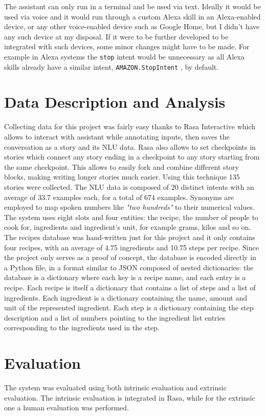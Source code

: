\documentclass[journal, 11pt]{IEEEtran}
\begin{document}
The assistant can only run in a terminal and be used via text. Ideally it would be used via voice and it would run through a custom Alexa skill in an Alexa-enabled device, or any other voice-enabled device such as Google Home, but I didn't have any such device at my disposal.
If it were to be further developed to be integrated with such devices, some minor changes might have to be made. For example in Alexa systems the \texttt{stop} intent would be unnecessary as all Alexa skills already have a similar intent, \texttt{AMAZON.StopIntent} \cite{rasatoalexa}, by default.


\section{Data Description and Analysis}
\label{sec:data-desc}
Collecting data for this project was fairly easy thanks to Rasa Interactive \cite{rasainteractive} which allows to interact with assistant while annotating inputs, then saves the conversation as a story and its NLU data.
Rasa also allows to set checkpoints in stories which connect any story ending in a checkpoint to any story starting from the same checkpoint. This allows to easily fork and combine different story blocks, making writing longer stories much easier. Using this technique 135 stories were collected.
The NLU data is composed of 20 distinct intents with an average of 33.7 examples each, for a total of 674 examples.
Synonyms are employed to map spoken numbers like \textit{"two hundreds"} to their numerical values.
The system uses eight slots and four entities: the recipe, the number of people to cook for, ingredients and ingredient's unit, for example grams, kilos and so on.
The recipes database was hand-written just for this project and it only contains four recipes, with an average of 4.75 ingredients and 10.75 steps per recipe.
Since the project only serves as a proof of concept, the database is encoded directly in a Python file, in a format similar to JSON composed of nested dictionaries: the database is a dictionary where each key is a recipe name, and each entry is a recipe.
Each recipe is itself a dictionary that contains a list of steps and a list of ingredients.
Each ingredient is a dictionary containing the name, amount and unit of the represented ingredient.
Each step is a dictionary containing the step description and a list of numbers pointing to the ingredient list entries corresponding to the ingredients used in the step.


\section{Evaluation}
\label{sec:eval}
The system was evaluated using both intrinsic evaluation and extrinsic evaluation.
The intrinsic evaluation is integrated in Rasa, while for the extrinsic one a human evaluation was performed.
\end{document}
